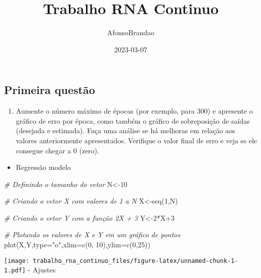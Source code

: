 \documentclass[
]{article}
\title{Trabalho RNA Continuo}
\author{AfonsoBrandao}
\date{2023-03-07}
\newenvironment{Shaded}{\begin{snugshade}}{\end{snugshade}}
\newcommand{\AttributeTok}[1]{\textcolor[rgb]{0.77,0.63,0.00}{#1}}
\newcommand{\CommentTok}[1]{\textcolor[rgb]{0.56,0.35,0.01}{\textit{#1}}}
\newcommand{\DecValTok}[1]{\textcolor[rgb]{0.00,0.00,0.81}{#1}}
\newcommand{\FunctionTok}[1]{\textcolor[rgb]{0.00,0.00,0.00}{#1}}
\newcommand{\NormalTok}[1]{#1}
\newcommand{\OtherTok}[1]{\textcolor[rgb]{0.56,0.35,0.01}{#1}}
\newcommand{\SpecialCharTok}[1]{\textcolor[rgb]{0.00,0.00,0.00}{#1}}
\newcommand{\StringTok}[1]{\textcolor[rgb]{0.31,0.60,0.02}{#1}}
\providecommand{\tightlist}{%
  \setlength{\itemsep}{0pt}\setlength{\parskip}{0pt}}
\begin{document}
\maketitle

\hypertarget{primeira-questuxe3o}{%
\subsection{Primeira questão}\label{primeira-questuxe3o}}

\begin{enumerate}
\def\labelenumi{\arabic{enumi})}
\tightlist
\item
  Aumente o número máximo de épocas (por exemplo, para 300) e apresente
  o gráfico de erro por época, como também o gráfico de sobreposição de
  saídas (desejada e estimada). Faça uma análise se há melhoras em
  relação aos valores anteriormente apresentados. Verifique o valor
  final de erro e veja se ele consegue chegar a 0 (zero).
\end{enumerate}

\begin{itemize}
\tightlist
\item
  Regressão modelo
\end{itemize}

\begin{Shaded}
\begin{Highlighting}[]
\CommentTok{\# Definindo o tamanho do vetor}
\NormalTok{N}\OtherTok{\textless{}{-}}\DecValTok{10}

\CommentTok{\# Criando o vetor X com valores de 1 a N}
\NormalTok{X}\OtherTok{\textless{}{-}}\FunctionTok{seq}\NormalTok{(}\DecValTok{1}\NormalTok{,N)}

\CommentTok{\# Criando o vetor Y com a função 2X + 3}
\NormalTok{Y}\OtherTok{\textless{}{-}}\DecValTok{2}\SpecialCharTok{*}\NormalTok{X}\SpecialCharTok{+}\DecValTok{3}

\CommentTok{\# Plotando os valores de X e Y em um gráfico de pontos}
\FunctionTok{plot}\NormalTok{(X,Y,}\AttributeTok{type=}\StringTok{"o"}\NormalTok{,}\AttributeTok{xlim=}\FunctionTok{c}\NormalTok{(}\DecValTok{0}\NormalTok{, }\DecValTok{10}\NormalTok{),}\AttributeTok{ylim=}\FunctionTok{c}\NormalTok{(}\DecValTok{0}\NormalTok{,}\DecValTok{25}\NormalTok{))}
\end{Highlighting}
\end{Shaded}

\texttt{[image: trabalho\_rna\_continuo\_files/figure-latex/unnamed-chunk-1-1.pdf]}
- Ajustes
\end{document}
